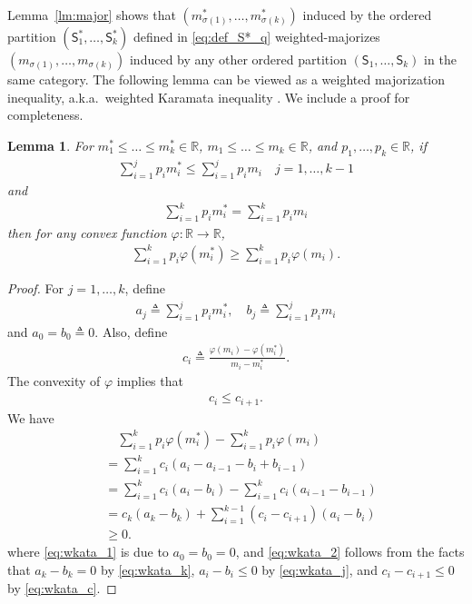 \documentclass[10pt,a4paper]{amsart}
\newtheorem{lemma}{Lemma}
\newcommand{\R}{\mathbb{R}}
\def\sS{{\mathsf S}}
\def\deq{\triangleq}
\begin{document}
Lemma~\ref{lm:major} shows that $(m^*_{\sigma(1)}, \ldots , m^*_{\sigma(k)})$ induced by the ordered partition $(\sS^*_1,\ldots,\sS^*_k)$ defined in \eqref{eq:def_S*_q} weighted-majorizes $( m_{\sigma(1)}, \ldots , m_{\sigma(k)})$ induced by any other ordered partition $(\sS_1,\ldots,\sS_k)$ in the same category.
The following lemma can be viewed as a weighted majorization inequality, a.k.a.\ weighted Karamata inequality \cite{Fuchs_weighted, Majorization_inequalities_IT}. 
We include a proof for completeness.
\begin{lemma}\label{lm:wkata}
For $m^*_1 \le \ldots \le m^*_k \in \R$, $m_{1} \le \ldots \le m_{k} \in \R$, and $p_1,\ldots, p_k \in \R$, if
\begin{align}
    \sum_{i=1}^j p_{i} m^*_{i}
    \le
    \sum_{i=1}^j p_{i} m_{i} \quad j=1,\ldots, k-1 \label{eq:wkata_j}
\end{align}
and 
\begin{align}
    \sum_{i=1}^k p_{i} m^*_{i}
    =
    \sum_{i=1}^k p_{i} m_{i} \label{eq:wkata_k}
\end{align}
then for any convex function $\varphi: \R \rightarrow \R$,
\begin{align}
    \sum_{i=1}^k p_{i} \varphi(m^*_{i})
    \ge
    \sum_{i=1}^k p_{i} \varphi( m_{i} ) .
\end{align}
\end{lemma}
\begin{proof}
For $j=1,\ldots,k$, define
\begin{align}
a_j \deq \sum_{i=1}^j p_i m^*_i, \quad
b_j \deq  \sum_{i=1}^j p_i m_i
\end{align}
and $a_0 = b_0 \deq 0$.
Also, define
\begin{align}
c_i \deq \frac{\varphi(m_i) - \varphi(m^*_i)}{m_i - m^*_i} .
\end{align}
The convexity of $\varphi$ implies that
\begin{align}
    c_i \le c_{i+1} . \label{eq:wkata_c}
\end{align}
We have
\begin{align}
    & \quad \sum_{i=1}^k p_{i} \varphi(m^*_{i})
    -
    \sum_{i=1}^k p_{i} \varphi( m_{i} ) \nonumber \\
    &= \sum_{i=1}^k c_i (a_i - a_{i-1} - b_i + b_{i-1}) \\
    &= \sum_{i=1}^k c_i (a_i - b_i)
    - \sum_{i=1}^k c_i (a_{i-1} - b_{i-1}) \\
    &= c_k(a_k-b_k) + \sum_{i=1}^{k-1}(c_i - c_{i+1})(a_i - b_i) \label{eq:wkata_1}\\ %
    &\ge 0 . \label{eq:wkata_2}
\end{align}
where \eqref{eq:wkata_1} is due to $a_0=b_0=0$, and \eqref{eq:wkata_2} follows from the facts that $a_k-b_k=0$ by \eqref{eq:wkata_k}, $a_i - b_i \le 0$ by \eqref{eq:wkata_j}, and $c_i - c_{i+1} \le 0$ by \eqref{eq:wkata_c}.
\end{proof}
\end{document}
